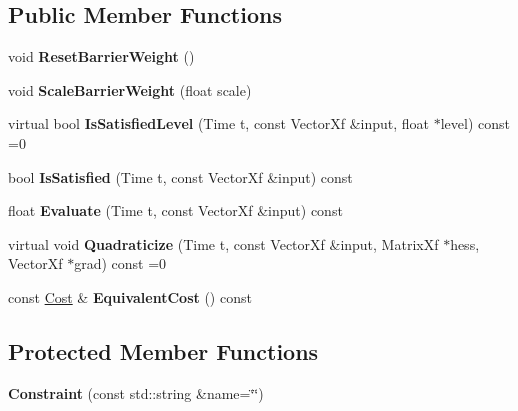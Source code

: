 \subsection*{Public Member Functions}
\begin{DoxyCompactItemize}
\item 
void {\bfseries Reset\+Barrier\+Weight} ()\hypertarget{classilqgames_1_1_constraint_af282fb2fae6fa61301c1f900899a388c}{}\label{classilqgames_1_1_constraint_af282fb2fae6fa61301c1f900899a388c}

\item 
void {\bfseries Scale\+Barrier\+Weight} (float scale)\hypertarget{classilqgames_1_1_constraint_a6474f6bbb0b2170254491062312e70f1}{}\label{classilqgames_1_1_constraint_a6474f6bbb0b2170254491062312e70f1}

\item 
virtual bool {\bfseries Is\+Satisfied\+Level} (Time t, const Vector\+Xf \&input, float $\ast$level) const =0\hypertarget{classilqgames_1_1_constraint_a1b2c7e1b5b29c9728502cc51a82d0edb}{}\label{classilqgames_1_1_constraint_a1b2c7e1b5b29c9728502cc51a82d0edb}

\item 
bool {\bfseries Is\+Satisfied} (Time t, const Vector\+Xf \&input) const \hypertarget{classilqgames_1_1_constraint_a2a7322945a8a57720c7fa48cf48eadb0}{}\label{classilqgames_1_1_constraint_a2a7322945a8a57720c7fa48cf48eadb0}

\item 
float {\bfseries Evaluate} (Time t, const Vector\+Xf \&input) const \hypertarget{classilqgames_1_1_constraint_aa9d8f8f9cf80d4de4e861c00d8e04df8}{}\label{classilqgames_1_1_constraint_aa9d8f8f9cf80d4de4e861c00d8e04df8}

\item 
virtual void {\bfseries Quadraticize} (Time t, const Vector\+Xf \&input, Matrix\+Xf $\ast$hess, Vector\+Xf $\ast$grad) const =0\hypertarget{classilqgames_1_1_constraint_a94538ad0da7e881d1a3bd4009c43f775}{}\label{classilqgames_1_1_constraint_a94538ad0da7e881d1a3bd4009c43f775}

\item 
const \hyperlink{classilqgames_1_1_cost}{Cost} \& {\bfseries Equivalent\+Cost} () const \hypertarget{classilqgames_1_1_constraint_a01d415fabb97d12b0c8b6f88bfc29f6f}{}\label{classilqgames_1_1_constraint_a01d415fabb97d12b0c8b6f88bfc29f6f}

\end{DoxyCompactItemize}
\subsection*{Protected Member Functions}
\begin{DoxyCompactItemize}
\item 
{\bfseries Constraint} (const std\+::string \&name=\char`\"{}\char`\"{})\hypertarget{classilqgames_1_1_constraint_a845ad9283a9921452afa22c34404302c}{}\label{classilqgames_1_1_constraint_a845ad9283a9921452afa22c34404302c}

\end{DoxyCompactItemize}
